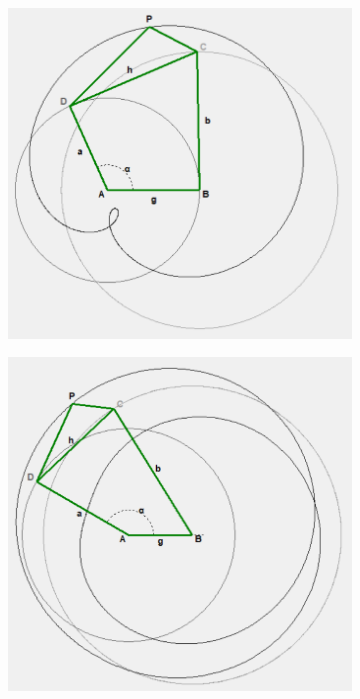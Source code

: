 \documentclass{article}
\begin{document}
\begin{figure}[h]
\begin{subfigure}{0.19\textwidth}
		\caption{}
	\end{subfigure}
	\hfill
	\begin{subfigure}{0.19\textwidth}
		\centering
		\includegraphics[width=\linewidth, height=0.95\linewidth, keepaspectratio]{./Figures/27_motion_cases/001.png}
		\caption{}
	\end{subfigure}
	\vfill
	\begin{subfigure}{0.19\textwidth}
		\centering
		\includegraphics[width=\linewidth, height=0.95\linewidth, keepaspectratio]{./Figures/27_motion_cases/-101.png}

\end{subfigure}
\end{figure}
\end{document}
